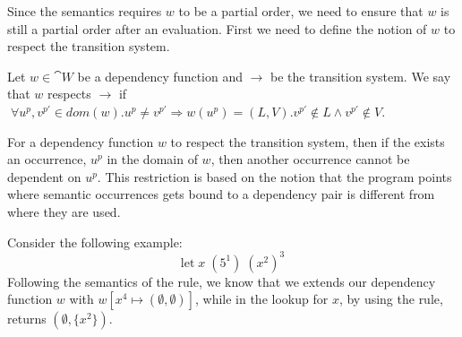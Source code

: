 \documentclass[../../master.tex]{subfiles}
\begin{document}
\begin{landscape}

\end{landscape}

\iffalse
Since the semantics requires $w$ to be a partial order, we need to ensure that $w$ is still a partial order after an evaluation.
First we need to define the notion of $w$ to respect the transition system.

\begin{definition}[]
	Let $w\in\cat{W}$ be a dependency function and $\rightarrow$ be the transition system.
	We say that $w$ respects $\rightarrow$ if $\;\forall u^{p},v^{p'}\in dom(w).u^{p}\neq v^{p'}\Rightarrow w(u^{p})=(L,V).v^{p'}\notin L\wedge v^{p'}\notin V$.
\end{definition}
For a dependency function $w$ to respect the transition system, then if the exists an occurrence, $u^{p}$ in the domain of $w$, then another occurrence cannot be dependent on $u^{p}$.
This restriction is based on the notion that the program points where semantic occurrences gets bound to a dependency pair is different from where they are used.

Consider the following example:
$$\mbox{let}\;x\;(5^1)\;(x^2)^3$$
Following the semantics of the  rule, we know that we extends our dependency function $w$ with $w[x^4\mapsto(\emptyset,\emptyset)]$, while in the lookup for $x$, by using the  rule, returns $(\emptyset,\{x^2\})$.
\end{document}
